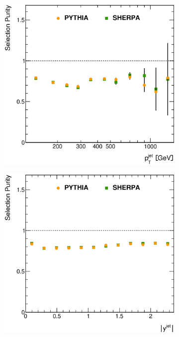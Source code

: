\documentclass[12pt, twoside]{article}
\numberwithin{equation}{section}
\numberwithin{figure}{section}
\newenvironment{changemargin}[2]{%
\begin{list}{}{%
\setlength{\topsep}{0pt}%
\setlength{\leftmargin}{#1}%
\setlength{\rightmargin}{#2}%
\setlength{\listparindent}{\parindent}%
\setlength{\itemindent}{\parindent}%
\setlength{\parsep}{\parskip}%
}%
\item[]}{\end{list}}
\begin{document}
\begin{figure}
\begin{changemargin}{-1.0cm}{-0.75cm}
\begin{changemargin}{-0.75cm}{-1.0cm}
        \vspace{0.2cm}
        \begin{subfigure}[b]{0.37\textwidth}
            \includegraphics[width=\textwidth]{./images/SelectionPurities/PUR-104.eps}
            \subcaption{}
            \label{fig:SelectionPuritiesPtJet}
        \end{subfigure}
        \begin{subfigure}[b]{0.37\textwidth}
            \includegraphics[width=\textwidth]{./images/SelectionPurities/PUR-105.eps}

\end{subfigure}
\end{changemargin}
\end{changemargin}
\end{figure}
\end{document}
